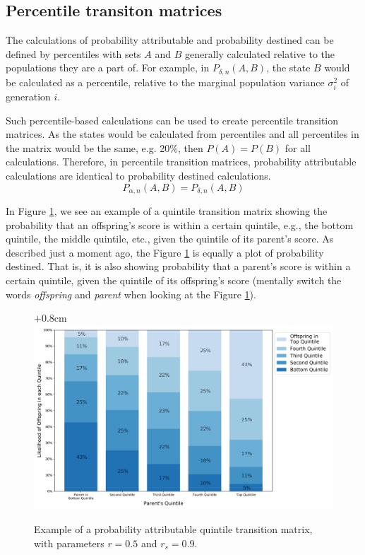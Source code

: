 \documentclass[letterpaper,10pt]{article} %
\begin{document}
\subsection{Percentile transiton matrices}

The calculations of probability attributable and probability destined can be defined by percentiles with sets $A$ and $B$ generally calculated relative to the populations they are a part of. For example, in $P_{\delta , n}(A, B)$, the state $B$ would be calculated as a percentile, relative to the marginal population variance $\sigma_i^2$ of generation $i$. 

Such percentile-based calculations can be used to create percentile transition matrices. As the states would be calculated from percentiles and all percentiles in the matrix would be the same, e.g. 20\%, then $P(A) = P(B)$ for all calculations. Therefore, in percentile transition matrices, probability attributable calculations are identical to probability destined calculations.
$$P_{\alpha , n}(A, B) = P_{\delta , n}(A, B)$$

In Figure \ref{fig:old_quintile_p1}, we see an example of a quintile transition matrix showing the probability that an offspring's score is within a certain quintile, e.g., the bottom quintile, the middle quintile, etc., given the quintile of its parent's score. As described just a moment ago, the Figure \ref{fig:old_quintile_p1} is equally a plot of probability destined. That is, it is also showing probability that a parent's score is within a certain quintile, given the quintile of its offspring's score (mentally switch the words \emph{offspring} and \emph{parent} when looking at the Figure \ref{fig:old_quintile_p1}).

\begin{figure}[h]
\centering
\advance\leftskip+0.8cm
\includegraphics[width=0.8\linewidth]{figures/model_mobility_n1000_r50_r_s90_.png} 
\caption{Example of a probability attributable quintile transition matrix, with parameters $r = 0.5$ and $r_s = 0.9$.}
\label{fig:old_quintile_p1}
\end{figure}
\end{document}
